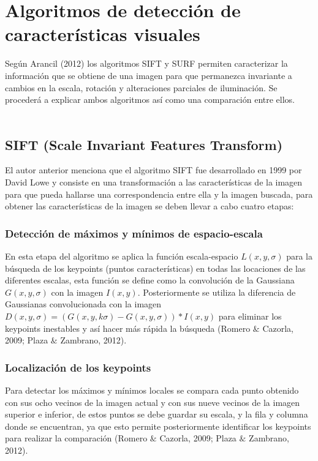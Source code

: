 \documentclass[letterpaper]{article}
\begin{document}
\section{Algoritmos de detección de características visuales}
Según Arancil (2012) los algoritmos SIFT y SURF permiten caracterizar la información que se obtiene de una imagen para que permanezca invariante a cambios en la escala, rotación y alteraciones parciales de iluminación. Se procederá a explicar ambos algoritmos así como una comparación entre ellos.\\\\
\subsection{SIFT (Scale Invariant Features Transform)}
El autor anterior menciona que el algoritmo SIFT fue desarrollado en 1999 por David Lowe y consiste en una transformación a las características de la imagen para que pueda hallarse una correspondencia entre ella y la imagen buscada, para obtener las características de la imagen se deben llevar a cabo cuatro etapas:
\subsubsection{Detección de máximos y mínimos de espacio-escala}
En esta etapa del algoritmo se aplica la función escala-espacio $L(x,y,\sigma)$ para la búsqueda de los keypoints (puntos características) en todas las locaciones de las diferentes escalas, esta función se define como la convolución de la Gaussiana $G(x,y,\sigma)$ con la imagen $I(x,y)$. Posteriormente se utiliza la diferencia de Gaussianas convolucionada con la imagen $D(x,y,\sigma)= (G(x,y,k\sigma)-G(x,y,\sigma))*I(x,y)$ para eliminar los keypoints inestables y así hacer más rápida la búsqueda (Romero $\&$ Cazorla, 2009; Plaza $\&$ Zambrano, 2012).
\subsubsection{Localización de los keypoints}
Para detectar los máximos y mínimos locales se compara cada punto obtenido con sus ocho vecinos de la imagen actual y con sus nueve vecinos de la imagen superior e inferior, de estos puntos se debe guardar su escala, y la fila y columna donde se encuentran, ya que esto permite posteriormente identificar los keypoints para realizar la comparación (Romero $\&$ Cazorla, 2009; Plaza $\&$ Zambrano, 2012).
\end{document}
